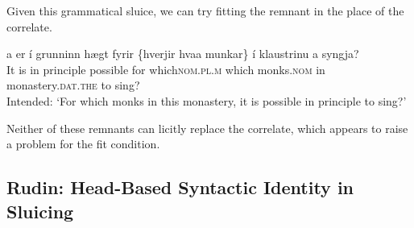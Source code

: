 \documentclass{turabian-researchpaper}
\begin{document}
Given this grammatical sluice, we can try fitting the remnant in the place of the correlate. 

\begin{exe}
\ex\label{monksis3}
\gll \TH a{\dh} er \'i  grunninn h\ae gt fyrir \{hverjir \textbar hva\dh a munkar\} \'i klaustrinu a{\dh} syngja? \\
It is in principle possible for which\textsc{nom.pl.m} which monks.\textsc{nom}  in monastery.\textsc{dat.the}  to   sing? \\ 
\trans Intended: `For which monks in this monastery, it is possible in principle to sing?'
\end{exe}

Neither of these remnants can licitly replace the correlate, which appears to raise a problem for the fit condition. 

\subsection{Rudin: Head-Based Syntactic Identity in Sluicing}









\clearpage
\end{document}
